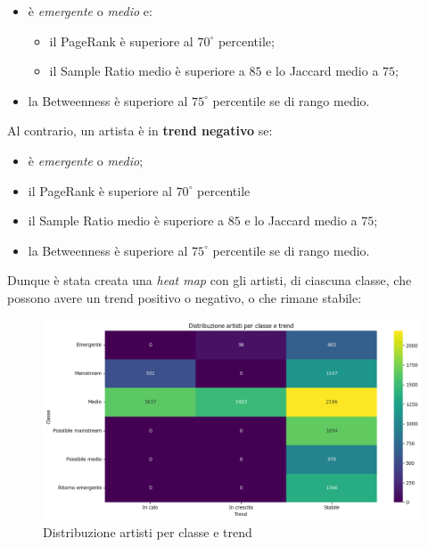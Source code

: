 \documentclass[sigchi]{acmart}
\begin{document}
\begin{itemize}
	\item è {\itshape emergente} o {\itshape medio} e:
	\begin{itemize}
		\item il PageRank è superiore al $70^\circ$ percentile;
		\item il Sample Ratio medio è superiore a $85$ e lo Jaccard medio a $75$;
	\end{itemize}
	\item la Betweenness è superiore al $75^\circ$ percentile se di rango medio.
\end{itemize}
Al contrario, un artista è in {\bfseries trend negativo} se:

\begin{itemize}
\item è {\itshape emergente} o {\itshape medio};
\item il PageRank è superiore al $70^\circ$ percentile
\item il Sample Ratio medio è superiore a $85$ e lo Jaccard medio a $75$;
\item la Betweenness è superiore al $75^\circ$ percentile se di rango medio.
\end{itemize}

\noindent Dunque è stata creata una {\itshape heat map} con gli artisti, di ciascuna classe, che possono avere un trend positivo o negativo, o che rimane stabile:

\begin{figure}[H]
\centering
\includegraphics[width=0.45
\textwidth]{../open_problem/plots/3_4/clTrendDist.png}
\caption{Distribuzione artisti per classe e trend}
\label{fig:clTrendDist}
\end{figure}
\end{document}
